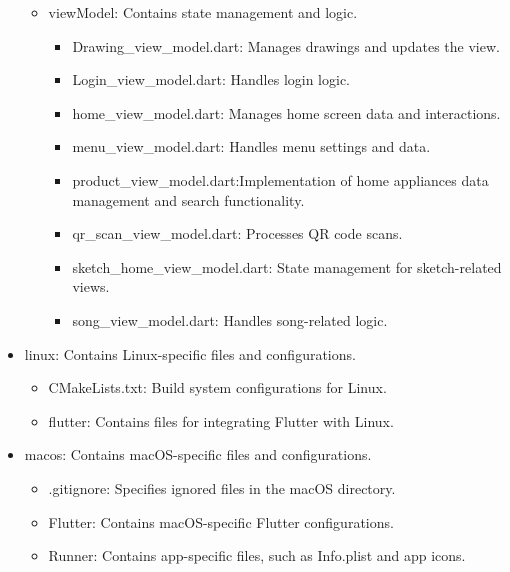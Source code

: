 \documentclass[conference]{IEEEtran}
\begin{document}
\begin{itemize}
\begin{itemize}
        \item viewModel: Contains state management and logic.
        \begin{itemize}
            \item Drawing\_view\_model.dart: Manages drawings and updates the view. \\
            \item Login\_view\_model.dart: Handles login logic. \\
            \item home\_view\_model.dart: Manages home screen data and interactions. \\
            \item menu\_view\_model.dart: Handles menu settings and data. \\
            \item product\_view\_model.dart:Implementation of home appliances data management and search functionality. \\
            \item qr\_scan\_view\_model.dart: Processes QR code scans. \\
            \item sketch\_home\_view\_model.dart: State management for sketch-related views. \\
            \item song\_view\_model.dart: Handles song-related logic. \\
        \end{itemize}
    \end{itemize}

    \item linux: Contains Linux-specific files and configurations.
    \begin{itemize}
        \item CMakeLists.txt: Build system configurations for Linux. \\
        \item flutter: Contains files for integrating Flutter with Linux. \\
    \end{itemize}

    \item macos: Contains macOS-specific files and configurations.
    \begin{itemize}
        \item .gitignore: Specifies ignored files in the macOS directory. \\
        \item Flutter: Contains macOS-specific Flutter configurations. \\
        \item Runner: Contains app-specific files, such as Info.plist and app icons. \\
    \end{itemize}


\end{itemize}
\end{document}
